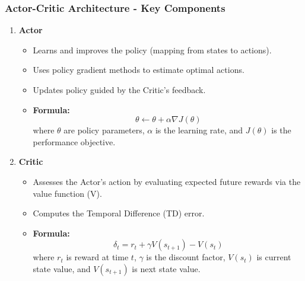 \documentclass{beamer}
\begin{document}
\begin{frame}[fragile]
    \frametitle{Actor-Critic Architecture - Key Components}
    \begin{enumerate}
        \item \textbf{Actor}
        \begin{itemize}
            \item Learns and improves the policy (mapping from states to actions).
            \item Uses policy gradient methods to estimate optimal actions.
            \item Updates policy guided by the Critic's feedback.
            \item \textbf{Formula:} 
            \begin{equation}
                \theta \leftarrow \theta + \alpha \nabla J(\theta)
            \end{equation}
            where \( \theta \) are policy parameters, \( \alpha \) is the learning rate, and \( J(\theta) \) is the performance objective.
        \end{itemize}

        \item \textbf{Critic}
        \begin{itemize}
            \item Assesses the Actor's action by evaluating expected future rewards via the value function (V).
            \item Computes the Temporal Difference (TD) error.
            \item \textbf{Formula:}
            \begin{equation}
                \delta_t = r_t + \gamma V(s_{t+1}) - V(s_t)
            \end{equation}
            where \( r_t \) is reward at time \( t \), \( \gamma \) is the discount factor, \( V(s_t) \) is current state value, and \( V(s_{t+1}) \) is next state value.
        \end{itemize}
    \end{enumerate}
\end{frame}
\end{document}
